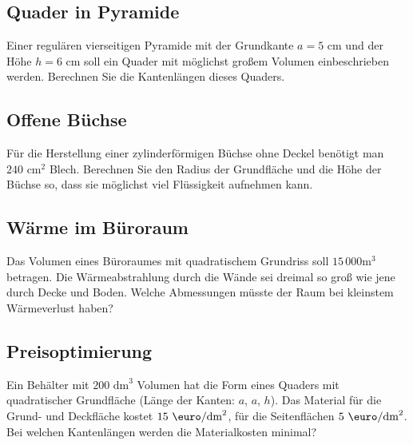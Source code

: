\subsection{Quader in Pyramide}
Einer regulären vierseitigen Pyramide mit der Grundkante $a = 5$ cm und der Höhe $h = 6$ cm
soll ein Quader mit möglichst großem Volumen einbeschrieben werden.
Berechnen Sie die Kantenlängen dieses Quaders.


\subsection{Offene Büchse}
Für die Herstellung einer zylinderförmigen Büchse ohne Deckel benötigt
man $240 \text{ cm}^2$ Blech. Berechnen Sie den Radius der Grundfläche und die Höhe der Büchse so, dass sie möglichst viel Flüssigkeit aufnehmen kann.





\subsection{Wärme im Büroraum}

Das Volumen eines Büroraumes mit quadratischem Grundriss soll $15\,000 \text{m}^3$ betragen. Die Wärmeabstrahlung durch die Wände sei dreimal so groß wie jene durch Decke und Boden. Welche Abmessungen müsste der Raum bei kleinstem Wärmeverlust haben?



\subsection{Preisoptimierung}

Ein Behälter mit $200 \text{ dm}^3$ Volumen hat die
Form eines Quaders mit quadratischer Grundfläche (Länge der Kanten: $a$, $a$, $h$). Das Material für die Grund-
und Deckfläche kostet $15 \text{ \euro} / \text{dm}^2$, für die Seitenflächen
$5 \text{ \euro} / \text{dm}^2$. Bei welchen Kantenlängen werden die Materialkosten minimal?

